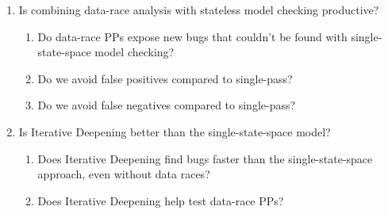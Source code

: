 \begin{enumerate}
	\item Is combining data-race analysis with stateless model checking productive?
		\begin{enumerate}
			\item Do data-race PPs expose new bugs that couldn't be found with single-state-space model checking?
			\item Do we avoid false positives compared to single-pass?
			\item Do we avoid false negatives compared to single-pass?
		\end{enumerate}
	\item Is Iterative Deepening better than the single-state-space model?
		\begin{enumerate}
			\item Does Iterative Deepening find bugs
				faster than the single-state-space approach, even without data races?
			\item Does Iterative Deepening help test data-race PPs?
		\end{enumerate}
\end{enumerate}
